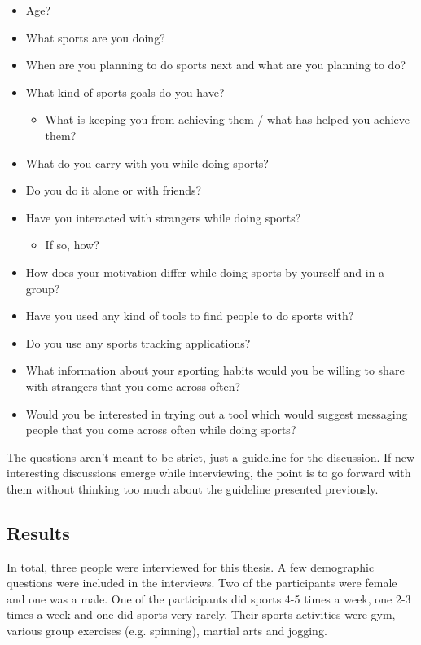 \begin{itemize}
	\item Age?
	\item What sports are you doing?
	\item When are you planning to do sports next and what are you planning to do?
	\item What kind of sports goals do you have?
		\begin{itemize}
			\item What is keeping you from achieving them / what has helped you achieve them?
		\end{itemize}
	\item What do you carry with you while doing sports?
	\item Do you do it alone or with friends?
	\item Have you interacted with strangers while doing sports?
		\begin{itemize}
			\item If so, how?
		\end{itemize}
	\item How does your motivation differ while doing sports by yourself and in a group?
	\item Have you used any kind of tools to find people to do sports with?
	\item Do you use any sports tracking applications?
	\item What information about your sporting habits would you be willing to share with strangers that you come across often?
	\item Would you be interested in trying out a tool which would suggest messaging people that you come across often while doing sports?
\end{itemize}

The questions aren't meant to be strict, just a guideline for the discussion. If new interesting discussions emerge while interviewing, the point is to go forward with them without thinking too much about the guideline presented previously.

\subsection{Results}

In total, three people were interviewed for this thesis. A few demographic questions were included in the interviews. Two of the participants were female and one was  a male. One of the participants did sports 4-5 times a week, one 2-3 times a week and one did sports very rarely. Their sports activities were gym, various group exercises (e.g. spinning), martial arts and jogging.

